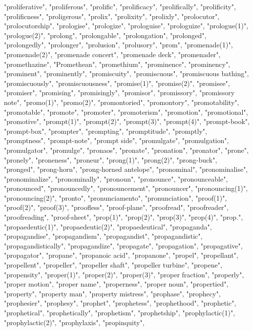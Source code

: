 "proliferative",
"proliferous",
"prolific",
"prolificacy",
"prolifically",
"prolificity",
"prolificness",
"proligerous",
"prolix",
"prolixity",
"prolixly",
"prolocutor",
"prolocutorship",
"prologise",
"prologize",
"prologuise",
"prologuize",
"prologue(1)",
"prologue(2)",
"prolong",
"prolongable",
"prolongation",
"prolonged",
"prolongedly",
"prolonger",
"prolusion",
"prolusory",
"prom",
"promenade(1)",
"promenade(2)",
"promenade concert",
"promenade deck",
"promenader",
"promethazine",
"Promethean",
"promethium",
"prominence",
"prominency",
"prominent",
"prominently",
"promiscuity",
"promiscuous",
"promiscuous bathing",
"promiscuously",
"promiscuousness",
"promise(1)",
"promise(2)",
"promisee",
"promiser",
"promising",
"promisingly",
"promisor",
"promissory",
"promissory note",
"promo(1)",
"promo(2)",
"promontoried",
"promontory",
"promotability",
"promotable",
"promote",
"promoter",
"promoterism",
"promotion",
"promotional",
"promotive",
"prompt(1)",
"prompt(2)",
"prompt(3)",
"prompt(4)",
"prompt-book",
"prompt-box",
"prompter",
"prompting",
"promptitude",
"promptly",
"promptness",
"prompt-note",
"prompt side",
"promulgate",
"promulgation",
"promulgator",
"promulge",
"pronaos",
"pronate",
"pronation",
"pronator",
"prone",
"pronely",
"proneness",
"proneur",
"prong(1)",
"prong(2)",
"prong-buck",
"pronged",
"prong-horn",
"prong-horned antelope",
"pronominal",
"pronominalise",
"pronominalize",
"pronominally",
"pronoun",
"pronounce",
"pronounceable",
"pronounced",
"pronouncedly",
"pronouncement",
"pronouncer",
"pronouncing(1)",
"pronouncing(2)",
"pronto",
"pronunciamento",
"pronunciation",
"proof(1)",
"proof(2)",
"proof(3)",
"proofless",
"proof-plane",
"proofread",
"proofreader",
"proofreading",
"proof-sheet",
"prop(1)",
"prop(2)",
"prop(3)",
"prop(4)",
"prop.",
"propaedeutic(1)",
"propaedeutic(2)",
"propaedeutical",
"propaganda",
"propagandise",
"propagandism",
"propagandist",
"propagandistic",
"propagandistically",
"propagandize",
"propagate",
"propagation",
"propagative",
"propagator",
"propane",
"propanoic acid",
"propanone",
"propel",
"propellant",
"propellent",
"propeller",
"propeller shaft",
"propeller turbine",
"propene",
"propensity",
"proper(1)",
"proper(2)",
"proper(3)",
"proper fraction",
"properly",
"proper motion",
"proper name",
"properness",
"proper noun",
"propertied",
"property",
"property man",
"property mistress",
"prophase",
"prophecy",
"prophesier",
"prophesy",
"prophet",
"prophetess",
"prophethood",
"prophetic",
"prophetical",
"prophetically",
"prophetism",
"prophetship",
"prophylactic(1)",
"prophylactic(2)",
"prophylaxis",
"propinquity",
